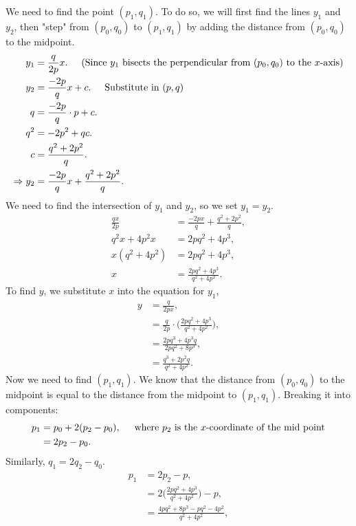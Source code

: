 \documentclass{amsart}
\theoremstyle{definition}
\theoremstyle{remark}
\begin{document}
\begin{enumerate}
\begin{enumerate}
We need to find the point $(p_1,q_1)$. To do so, we will first find the lines $y_1$ and $y_2$, then "step" from $(p_0,q_0)$ to $(p_1,q_1)$ by adding the distance from $(p_0,q_0)$ to the midpoint.
\begin{align*}
y_1 &= \frac{q}{2p}x. \hspace{0.5cm} \text{(Since } y_1 \text{ bisects the perpendicular from } (p_0,q_0) \text{ to the } x \text{-axis)}\\
y_2 &= \frac{-2p}{q}x + c. \hspace{0.5cm} \text{Substitute in } (p,q)\\
q &= \frac{-2p}{q} \cdot p + c.\\
q^2 &= -2p^2 + qc.\\
c &= \frac{q^2+2p^2}{q}.\\
\Rightarrow y_2 &= \frac{-2p}{q}x + \frac{q^2 + 2p^2}{q}.
\end{align*}
We need to find the intersection of $y_1$ and $y_2$, so we set $y_1 = y_2$.
\begin{align*}
\frac{qx}{2p} &= \frac{-2px}{q} + \frac{q^2+2p^2}{q},\\
q^2x+4p^2x &= 2pq^2 +4p^3,\\
x(q^2+4p^2) &= 2pq^2+4p^3,\\
x &= \frac{2pq^2 +4p^3}{q^2+4p^2}.
\end{align*}
To find $y$, we substitute $x$ into the equation for $y_1$,
\begin{align*}
y &= \frac{q}{2px},\\
&= \frac{q}{2p} \cdot \bigg( \frac{2pq^2 + 4p^3}{q^2+4p^2} \bigg),\\
&= \frac{2pq^3+4p^3q}{2pq^2+8p^3},\\
&= \frac{q^3+2p^2q}{q^2+4p^2}.
\end{align*}
Now we need to find $(p_1,q_1)$. We know that the distance from $(p_0,q_0)$ to the midpoint is equal to the distance from the midpoint to $(p_1,q_1)$. Breaking it into components:
\begin{align*}
p_1 &= p_0 + 2(p_2-p_0), \hspace{0.5cm} \text{where } p_2 \text{ is the } x \text{-coordinate of the mid point}\\
&= 2p_2 - p_0.
\end{align*}
Similarly, $q_1 = 2q_2 - q_0$.
\begin{align*}
p_1 &= 2p_2-p,\\
&= 2 \bigg( \frac{2pq^2 + 4p^3}{q^2+4p^2} \bigg) - p,\\
&= \frac{4pq^2 + 8p^3 - pq^2 - 4p^2}{q^2+4p^2},\\

\end{align*}
\end{enumerate}
\end{enumerate}
\end{document}
